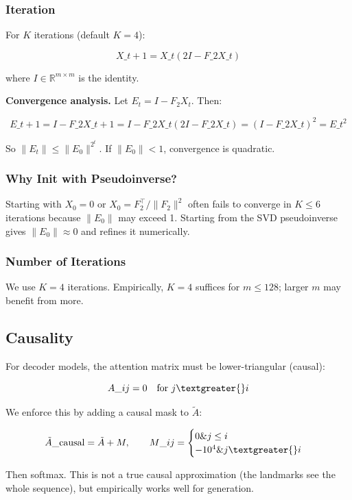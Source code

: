 \subsubsection{Iteration}

For $K$ iterations (default $K = 4$):

\[
X\_{t+1} = X\_t (2I - F\_2 X\_t)
\]

where $I \in \mathbb{R}^{m \times m}$ is the identity.

\textbf{Convergence analysis.} Let $E_t = I - F_2 X_t$. Then:

\[
E\_{t+1} = I - F\_2 X\_{t+1} = I - F\_2 X\_t (2I - F\_2 X\_t) = (I - F\_2 X\_t)^2 = E\_t^2
\]

So $\|E_t\| \le \|E_0\|^{2^t}$. If $\|E_0\| < 1$, convergence is quadratic.

\subsubsection{Why Init with Pseudoinverse?}

Starting with $X_0 = 0$ or $X_0 = F_2^\top / \|F_2\|^2$ often fails to 
converge in $K \le 6$ iterations because $\|E_0\|$ may exceed 1. Starting 
from the SVD pseudoinverse gives $\|E_0\| \approx 0$ and refines it 
numerically.

\subsubsection{Number of Iterations}

We use $K = 4$ iterations. Empirically, $K = 4$ suffices for 
$m \le 128$; larger $m$ may benefit from more.

\subsection{Causality}

For decoder models, the attention matrix must be lower-triangular (causal):

\[
A\_{ij} = 0 \quad \text{for } j \textgreater{} i
\]

We enforce this by adding a causal mask to $\tilde{A}$:

\[
\tilde{A}\_\text{causal} = \tilde{A} + M, \qquad
M\_{ij} = \begin{cases} 0 \& j \le i \\ -10^4 \& j \textgreater{} i \end{cases}
\]

Then softmax. This is not a true causal approximation (the landmarks see 
the whole sequence), but empirically works well for generation.


